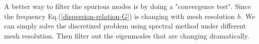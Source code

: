 A better way to filter the spurious modes is by doing a "convergence test". Since the frequency Eq.(\ref{dispersion-relation-G}) is changing with mesh resolution $h$. We can simply solve the discretized problem using spectral method under different mesh resolution. Then filter out the eigenmodes that are changing dramatically.

